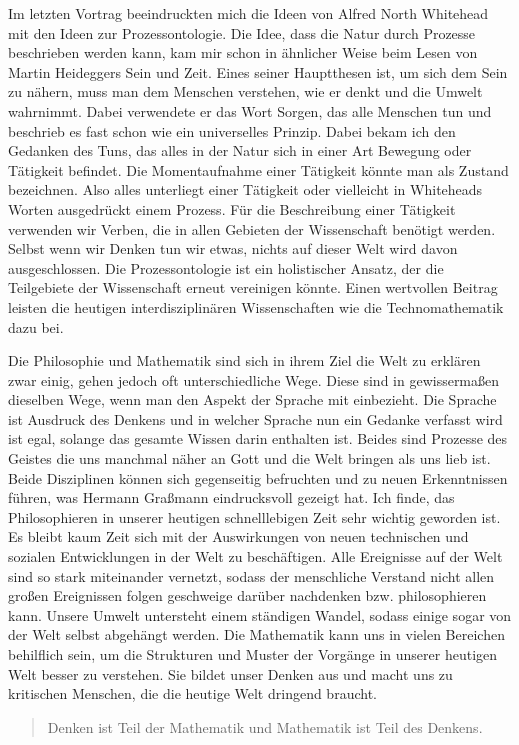 \documentclass[DIN,
	fontsize=12pt,
a4paper]{scrartcl}
\begin{document}
Im letzten Vortrag beeindruckten mich die Ideen von Alfred North Whitehead mit den Ideen zur Prozessontologie.
Die Idee, dass die Natur durch Prozesse beschrieben werden kann, kam mir schon in ähnlicher Weise beim Lesen von Martin Heideggers Sein und Zeit.
Eines seiner Hauptthesen ist, um sich dem Sein zu nähern, muss man dem Menschen verstehen, wie er denkt und die Umwelt wahrnimmt.
Dabei verwendete er das Wort Sorgen, das alle Menschen tun und beschrieb es fast schon wie ein universelles Prinzip.
Dabei bekam ich den Gedanken des Tuns, das alles in der Natur sich in einer Art Bewegung oder Tätigkeit befindet.
Die Momentaufnahme einer Tätigkeit könnte man als Zustand bezeichnen.
Also alles unterliegt einer Tätigkeit oder vielleicht in Whiteheads Worten ausgedrückt einem Prozess.
Für die Beschreibung einer Tätigkeit verwenden wir Verben, die in allen Gebieten der Wissenschaft benötigt werden.
Selbst wenn wir Denken tun wir etwas, nichts auf dieser Welt wird davon ausgeschlossen.
Die Prozessontologie ist ein holistischer Ansatz, der die Teilgebiete der Wissenschaft erneut vereinigen könnte.
Einen wertvollen Beitrag leisten die heutigen interdisziplinären Wissenschaften wie die Technomathematik dazu bei.

Die Philosophie und Mathematik sind sich in ihrem Ziel die Welt zu erklären zwar einig, gehen jedoch oft unterschiedliche Wege.
Diese sind in gewissermaßen dieselben Wege, wenn man den Aspekt der Sprache mit einbezieht.
Die Sprache ist Ausdruck des Denkens und in welcher Sprache nun ein Gedanke verfasst wird ist egal, solange das gesamte Wissen darin enthalten ist.
Beides sind Prozesse des Geistes die uns manchmal näher an Gott und die Welt bringen als uns lieb ist.
Beide Disziplinen können sich gegenseitig befruchten und zu neuen Erkenntnissen führen, was Hermann Graßmann eindrucksvoll gezeigt hat.
Ich finde, das Philosophieren in unserer heutigen schnelllebigen Zeit sehr wichtig geworden ist.
Es bleibt kaum Zeit sich mit der Auswirkungen von neuen technischen und sozialen Entwicklungen in der Welt zu beschäftigen.
Alle Ereignisse auf der Welt sind so stark miteinander vernetzt, sodass der menschliche Verstand nicht allen großen Ereignissen folgen geschweige darüber nachdenken bzw. philosophieren kann.
Unsere Umwelt untersteht einem ständigen Wandel, sodass einige sogar von der Welt selbst abgehängt werden.
Die Mathematik kann uns in vielen Bereichen behilflich sein, um die Strukturen und Muster der Vorgänge in unserer heutigen Welt besser zu verstehen.
Sie bildet unser Denken aus und macht uns zu kritischen Menschen, die die heutige Welt dringend braucht.

\begin{quote}
Denken ist Teil der Mathematik und Mathematik ist Teil des Denkens.
\end{quote}
\end{document}
